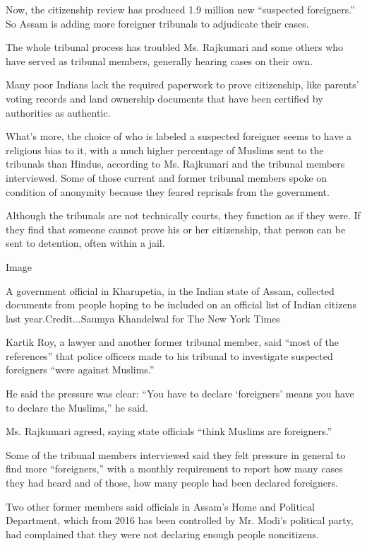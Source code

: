 Now, the citizenship review has produced 1.9 million new ``suspected
foreigners.'' So Assam is adding more foreigner tribunals to adjudicate
their cases.

The whole tribunal process has troubled Ms. Rajkumari and some others
who have served as tribunal members, generally hearing cases on their
own.

Many poor Indians lack the required paperwork to prove citizenship, like
parents' voting records and land ownership documents that have been
certified by authorities as authentic.

What's more, the choice of who is labeled a suspected foreigner seems to
have a religious bias to it, with a much higher percentage of Muslims
sent to the tribunals than Hindus, according to Ms. Rajkumari and the
tribunal members interviewed. Some of those current and former tribunal
members spoke on condition of anonymity because they feared reprisals
from the government.

Although the tribunals are not technically courts, they function as if
they were. If they find that someone cannot prove his or her
citizenship, that person can be sent to detention, often within a jail.

Image

A government official in Kharupetia, in the Indian state of Assam,
collected documents from people hoping to be included on an official
list of Indian citizens last year.Credit...Saumya Khandelwal for The New
York Times

Kartik Roy, a lawyer and another former tribunal member, said ``most of
the references'' that police officers made to his tribunal to
investigate suspected foreigners ``were against Muslims.''

He said the pressure was clear: ``You have to declare `foreigners' means
you have to declare the Muslims,'' he said.

Ms. Rajkumari agreed, saying state officials ``think Muslims are
foreigners.''

Some of the tribunal members interviewed said they felt pressure in
general to find more ``foreigners,'' with a monthly requirement to
report how many cases they had heard and of those, how many people had
been declared foreigners.

Two other former members said officials in Assam's Home and Political
Department, which from 2016 has been controlled by Mr. Modi's political
party, had complained that they were not declaring enough people
noncitizens.

